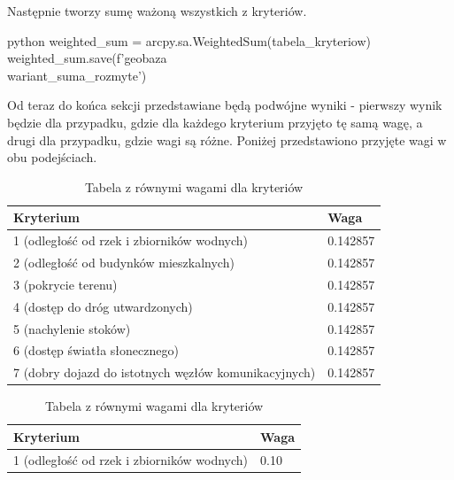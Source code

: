 \documentclass{article}
\begin{document}
Następnie tworzy sumę ważoną wszystkich z kryteriów.
\vspace{5pt}

\begin{mintedbox}{python}
weighted_sum = arcpy.sa.WeightedSum(tabela_kryteriow)
weighted_sum.save(f'{geobaza}\\{wariant}_suma_rozmyte')
\end{mintedbox}
\vspace{10pt}

Od teraz do końca sekcji przedstawiane będą podwójne wyniki - pierwszy wynik będzie dla przypadku, gdzie dla każdego kryterium przyjęto tę samą wagę, a drugi dla przypadku, gdzie wagi są różne. Poniżej przedstawiono przyjęte wagi w obu podejściach.
\begin{table}[ht]
    \begin{minipage}{0.48\textwidth}
        \centering
        \renewcommand{\arraystretch}{1.2}
        \begin{tabular}{|p{4cm}|p{1.4cm}|}
        \hline
        \textbf{Kryterium} & \textbf{Waga}\\
        \hline
        1 (odległość od rzek i zbiorników wodnych) & 0.142857\\
        \hline
        2 (odległość od budynków mieszkalnych) & 0.142857\\
        \hline
        3 (pokrycie terenu) & 0.142857\\
        \hline
        4 (dostęp do dróg utwardzonych) & 0.142857\\
        \hline
        5 (nachylenie stoków) & 0.142857\\    
        \hline
        6 (dostęp światła słonecznego) & 0.142857\\
        \hline
        7 (dobry dojazd do istotnych węzłów komunikacyjnych) & 0.142857\\
        \hline
        \end{tabular}
        \caption{Tabela z równymi wagami dla kryteriów}
        \label{tab:bdot_costs_equal}
    \end{minipage}
    \hfill
    \begin{minipage}{0.48\textwidth}
        \centering
        \renewcommand{\arraystretch}{1.2}
        \begin{tabular}{|p{4cm}|p{1cm}|}
        \hline
        \textbf{Kryterium} & \textbf{Waga}\\
        \hline
        1 (odległość od rzek i zbiorników wodnych) & 0.10\\
        \hline

\end{tabular}
\end{minipage}
\end{table}
\end{document}
